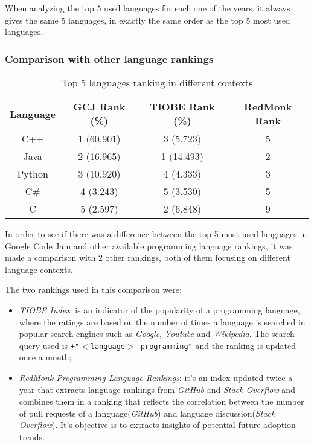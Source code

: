 \documentclass{article}
\begin{document}
\begin{multicols*}{2}
When analyzing the top 5 used languages for each one of the years, it always gives the same 5 languages, in exactly the same order as the top 5 most used languages.


\subsubsection{Comparison with other language rankings}

\begin{table*}[!ht]
\centering
\caption{Top 5 languages ranking in different contexts}
\label{diff_contexts}
\begin{tabular}{c|c|c|c}
\textbf{Language} & \textbf{GCJ Rank (\%)} & \textbf{TIOBE Rank (\%)} & \textbf{RedMonk Rank} \\ \hline
C++               & 1 (60.901)             & 3 (5.723)                & 5                     \\
Java              & 2 (16.965)             & 1 (14.493)               & 2                     \\
Python            & 3 (10.920)             & 4 (4.333)                & 3                     \\
C\#               & 4 (3.243)              & 5 (3.530)                & 5                     \\
C                 & 5 (2.597)              & 2 (6.848)                & 9
\end{tabular}
\end{table*}

In order to see if there was a difference between the top 5 most used languages in Google Code Jam and other available programming language rankings, it was made a comparison with 2 other rankings, both of them focusing on different language contexts.

The two rankings used in this comparison were:
\begin{itemize}
    \item \textit{TIOBE Index}: is an indicator of the popularity of a programming language\cite{tiobe}, where the ratings are based on the number of times a language is searched in popular search engines such as \textit{Google}, \textit{Youtube} and \textit{Wikipedia}. The search query used is \texttt{+"$<$language$>$ programming"} and the ranking is updated once a month;
    \item \textit{RedMonk Programming Language Rankings}: it's an index updated twice a year that extracts language rankings from \textit{GitHub} and \textit{Stack Overflow} and combines them in a ranking that reflects the correlation between the number of pull requests of a language(\textit{GitHub}) and language discussion(\textit{Stack Overflow})\cite{redmonk}. It's objective is to extracts insights of potential future adoption trends.
\end{itemize}



\end{multicols*}
\end{document}

